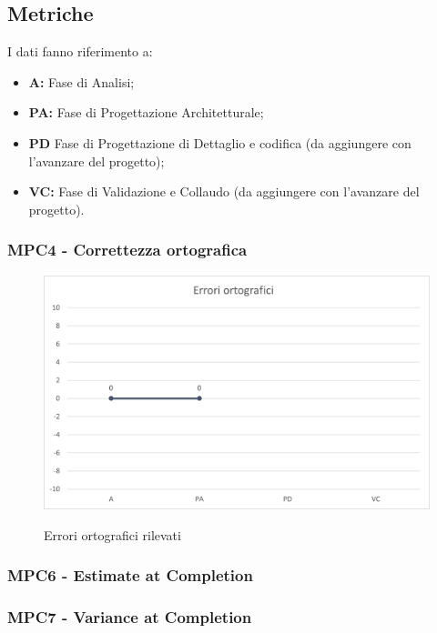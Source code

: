 \subsection{Metriche}

I dati fanno riferimento a:
\begin{itemize}
	\item \textbf{A:} Fase di Analisi;
	\item \textbf{PA:} Fase di Progettazione Architetturale;
	\item \textbf{PD} Fase di Progettazione di Dettaglio e codifica (da aggiungere con l'avanzare del progetto);
	\item \textbf{VC: } Fase di Validazione e Collaudo (da aggiungere con l'avanzare del progetto).
\end{itemize}



\subsubsection{MPC4 - Correttezza ortografica}
\begin{figure}[H]
\centering
\includegraphics[scale=0.90]{res/ResocontoAttivitaDiVerifica/res/metriche/grafici/img/correttezzaOrtografica.png}\\
\caption{Errori ortografici rilevati}
\end{figure}

\subsubsection{MPC6 - Estimate at Completion}

\subsubsection{MPC7 - Variance at Completion}

